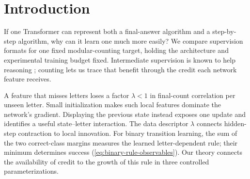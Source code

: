 \begin{abstract}
A Transformer can represent a counting algorithm yet struggle to learn it from final answers.
We explain how running-count supervision changes the gradient signal. Each unseen letter contracts
a feature's correlation with the final count, while small initialization favors features that read
few letters. In a two-block Transformer containing exact solutions for both formats, outcome
cross-entropy gradient flow from a zero readout therefore stays near chance for exponential time.
Displayed states expose a local innovation: rule credit is generically nonzero and has a quantitative
Gaussian lower bound under a quantitative geometric initialization event. Structured joint gradient
flow learns transitions in polynomial time, tolerates fixed query--key perturbations, and, in a separate tied feature model, learns the current-letter relative offset. The positive results retain specified
feature roles and training metrics. Experiments support the mechanism beyond these assumptions,
including LoRA-tuned object tracking, but a five-object reversal shows its empirical limits.
\end{abstract}

\section{Introduction}
\label{sec:intro}

If one Transformer can represent both a final-answer algorithm and a step-by-step algorithm,
why can it learn one much more easily? We compare supervision formats for one fixed modular-counting
target, holding the architecture and experimental training budget fixed. Intermediate supervision
is known to help reasoning \citep{nye2021scratchpads,wei2022cot,lightman2023verify}; counting lets us
trace that benefit through the credit each network feature receives.

A feature that misses letters loses a factor $\lambda<1$ in final-count correlation per unseen letter.
Small initialization makes such local features dominate the network's gradient. Displaying the
previous state instead exposes one update and identifies a useful state--letter interaction.
The data descriptor $\lambda$ connects hidden-step contraction to local innovation.
For binary transition learning, the sum of the two correct-class margins measures
the learned letter-dependent rule; their minimum determines success
(\cref{eq:binary-rule-observables}). Our theory connects the availability of credit
to the growth of this rule in three controlled parameterizations.


